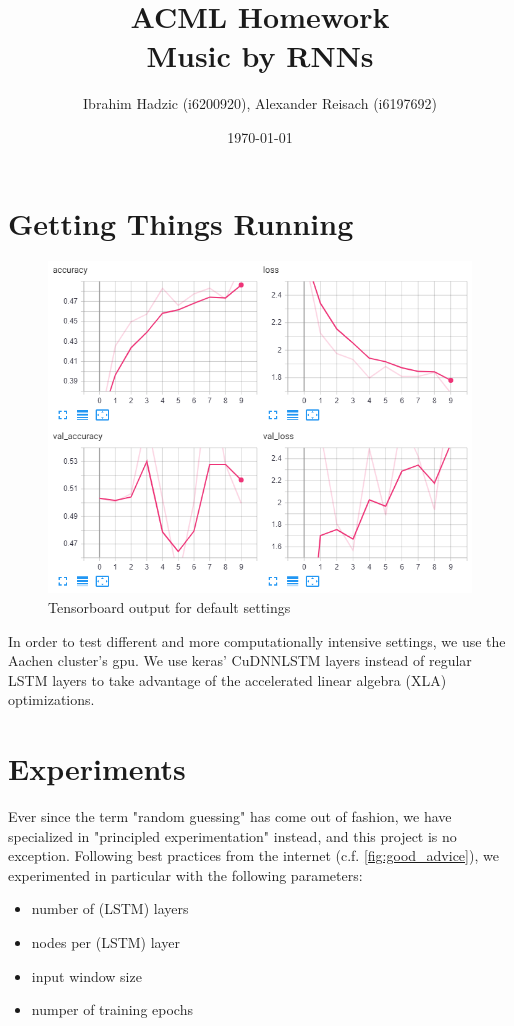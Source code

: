 \documentclass{article}
\title{ACML Homework \\ Music by RNNs}
\author{Ibrahim Hadzic (i6200920), Alexander Reisach (i6197692)}
\date{\today}
\begin{document}
\maketitle

\section{Getting Things Running}

\begin{figure}[h]
    \centering
    \includegraphics[scale=0.45]{tensorboard_2.png}
    \caption{Tensorboard output for default settings}
    \label{fig:tensorboard_1}
\end{figure}

In order to test different and more computationally intensive settings, we use the Aachen cluster's gpu. We use keras' CuDNNLSTM layers instead of regular LSTM layers to take advantage of the accelerated linear algebra (XLA) optimizations.


\section{Experiments}
Ever since the term "random guessing" has come out of fashion, we have specialized in "principled experimentation" instead, and this project is no exception. Following best practices from the internet (c.f. \ref{fig:good_advice}), we experimented in particular with the following parameters:
\begin{itemize}
    \item number of (LSTM) layers
    \item nodes per (LSTM) layer
    \item input window size
    \item numper of training epochs
\end{itemize}
\end{document}
